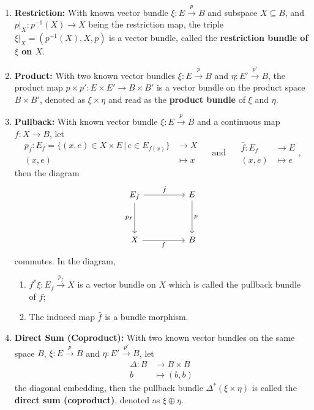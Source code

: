 \documentclass[10pt]{article}
\begin{document}
\begin{enumerate}
\item \textbf{Restriction:} With known vector bundle $\xi:E\overset{p}{\to}B$ and subspace $X\subseteq B$, and $p\big|_X:p^{-1}(X)\to X$ being the restriction map, the triple $\xi\big|_X=(p^{-1}(X),X,p)$ is a vector bundle, called the \textbf{restriction bundle of $\xi$ on $X$}.
\item \textbf{Product:} With two known vector bundles $\xi:E\overset{p}{\to}B$ and $\eta:E'\overset{p'}{\to}B$, the product map $p\times p':E\times E'\to B\times B'$ is a vector bundle on the product space $B\times B'$, denoted as $\xi\times\eta$ and read as the \textbf{product bundle} of $\xi$ and $\eta$.
\item \colorbox{red!30}{\textbf{Pullback:}} With known vector bundle $\xi:E\overset{p}{\to}B$ and a continuous map $f:X\to B$, let $$\begin{aligned}p_f:E_f=\{(x,e)\in X\times E\,\big|\,e\in E_{f(x)}\}&\to X\\(x,e)&\mapsto x\end{aligned}\quad\text{ and }\quad\begin{aligned}\hat{f}:E_f&\to E\\(x,e)&\mapsto e\end{aligned},$$ then the diagram
$$\begin{tikzcd}
E_f \arrow[dd, "p_f"'] \arrow[rr, "\hat{f}"] &  & E \arrow[dd, "p"] \\
                                             &  &                   \\
X \arrow[rr, "f"']                           &  & B
\end{tikzcd}$$
commutes. In the diagram, \begin{enumerate}\item $f^*\xi:E_f\overset{p_f}{\to}X$ is a vector bundle on $X$ which is called the pullback bundle of $f$;\item The induced map $\hat{f}$ is a bundle morphism.\end{enumerate}
\item \textbf{Direct Sum (Coproduct):} With two known vector bundles on the same space $B$, $\xi:E\overset{p}{\to}B$ and $\eta:E'\overset{p'}{\to}B$, let \begin{align*}\Delta:B&\to B\times B\\b&\mapsto(b,b)\end{align*} the diagonal embedding, then the pullback bundle $\Delta^*(\xi\times\eta)$ is called the \textbf{direct sum (coproduct)}, denoted as $\xi\oplus\eta$.
\end{enumerate}
\end{document}
